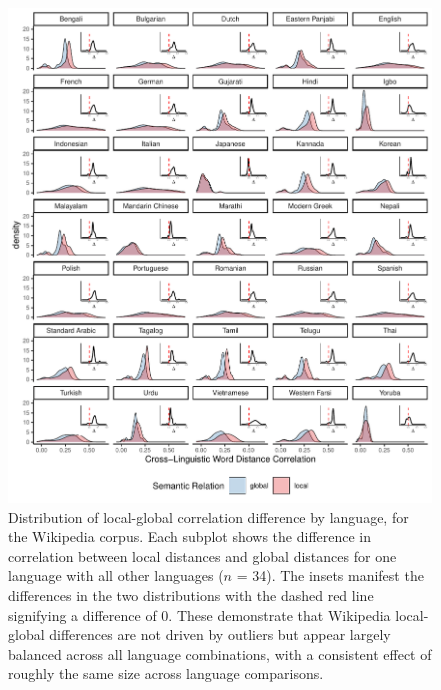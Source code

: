 \documentclass[9pt,twoside,lineno]{pnas-new}
\begin{document}
 \begin{figure}[h]
\centering
     \includegraphics[width = 7in]{suppfigs/local_global_language_dist_ED_WIKI.pdf}
         \caption{Distribution of local-global correlation difference by language, for the Wikipedia corpus. Each subplot shows the difference in correlation between local distances and global distances for one language with all other languages ($n$ = 34). The insets manifest the differences in the two distributions with the dashed red line signifying a difference of 0. These demonstrate that Wikipedia local-global differences are not driven by outliers but appear largely balanced across all language combinations, with a consistent effect of roughly the same size across language comparisons.
}
\end{figure}

\pagebreak
 \clearpage
 
\end{document}
